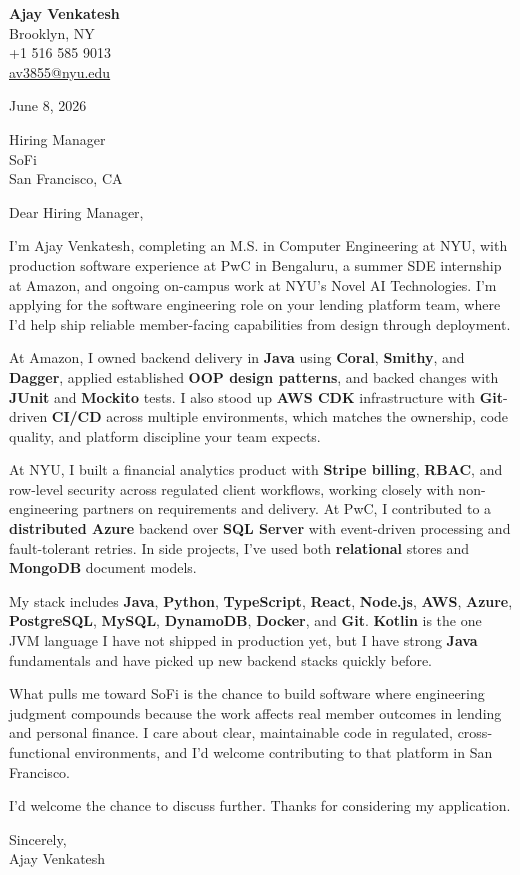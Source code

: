 \documentclass[letterpaper,11pt]{article}
\begin{document}
\begin{flushleft}
\textbf{\large Ajay Venkatesh} \\
Brooklyn, NY \\
+1 516 585 9013 \\
\href{mailto:av3855@nyu.edu}{av3855@nyu.edu}
\end{flushleft}
\vspace{10pt}
June 8, 2026
\vspace{6pt}

Hiring Manager \\
SoFi \\
San Francisco, CA

\vspace{10pt}

Dear Hiring Manager,

I'm Ajay Venkatesh, completing an M.S. in Computer Engineering at NYU, with production software experience at PwC in Bengaluru, a summer SDE internship at Amazon, and ongoing on-campus work at NYU's Novel AI Technologies. I'm applying for the software engineering role on your lending platform team, where I'd help ship reliable member-facing capabilities from design through deployment.

At Amazon, I owned backend delivery in \textbf{Java} using \textbf{Coral}, \textbf{Smithy}, and \textbf{Dagger}, applied established \textbf{OOP design patterns}, and backed changes with \textbf{JUnit} and \textbf{Mockito} tests. I also stood up \textbf{AWS CDK} infrastructure with \textbf{Git}-driven \textbf{CI/CD} across multiple environments, which matches the ownership, code quality, and platform discipline your team expects.

At NYU, I built a financial analytics product with \textbf{Stripe billing}, \textbf{RBAC}, and row-level security across regulated client workflows, working closely with non-engineering partners on requirements and delivery. At PwC, I contributed to a \textbf{distributed Azure} backend over \textbf{SQL Server} with event-driven processing and fault-tolerant retries. In side projects, I've used both \textbf{relational} stores and \textbf{MongoDB} document models.

My stack includes \textbf{Java}, \textbf{Python}, \textbf{TypeScript}, \textbf{React}, \textbf{Node.js}, \textbf{AWS}, \textbf{Azure}, \textbf{PostgreSQL}, \textbf{MySQL}, \textbf{DynamoDB}, \textbf{Docker}, and \textbf{Git}. \textbf{Kotlin} is the one JVM language I have not shipped in production yet, but I have strong \textbf{Java} fundamentals and have picked up new backend stacks quickly before.

What pulls me toward SoFi is the chance to build software where engineering judgment compounds because the work affects real member outcomes in lending and personal finance. I care about clear, maintainable code in regulated, cross-functional environments, and I'd welcome contributing to that platform in San Francisco.

I'd welcome the chance to discuss further. Thanks for considering my application.

\vspace{12pt}
Sincerely, \\
Ajay Venkatesh
\end{document}

